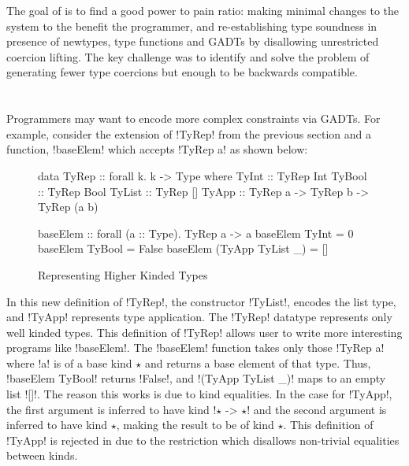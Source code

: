\documentclass[screen,nonacm,manuscript,review]{acmart} %
\begin{document}
The goal of \SFR is to find a good power to pain ratio: making
minimal changes to the system to the benefit the programmer, and
re-establishing type soundness in presence of newtypes, type functions
and GADTs by disallowing unrestricted coercion lifting. The key
challenge was to identify and solve the problem of generating fewer
type coercions but enough to be backwards compatible.

\section{\SFK}\label{sec:sfk} %
Programmers may want to encode more complex constraints via GADTs. For example,
consider the extension of !TyRep! from the previous section and a function, !baseElem!
which accepts !TyRep a! as shown below:

\begin{figure}[ht]
\begin{minipage}[ht]{0.5\linewidth}
\begin{code}
data TyRep :: forall k. k -> Type where
   TyInt  :: TyRep Int
   TyBool :: TyRep Bool
   TyList :: TyRep []
   TyApp  :: TyRep a -> TyRep b -> TyRep (a b)
\end{code}
\end{minipage}%
\begin{minipage}[ht]{0.6\linewidth}
\begin{code}
baseElem :: forall (a :: Type). TyRep a -> a
baseElem TyInt = 0
baseElem TyBool = False
baseElem (TyApp TyList _) = []
\end{code}
\end{minipage}
\caption{Representing Higher Kinded Types}
\end{figure}

In this new definition of !TyRep!, the constructor !TyList!, encodes the list type,
and !TyApp! represents type application. The !TyRep! datatype represents only well kinded
types. This definition of !TyRep! allows user
to write more interesting programs like !baseElem!.
The !baseElem! function takes only those !TyRep a! where !a! is of a base kind $\star$ and returns
a base element of that type. Thus, !baseElem TyBool! returns !False!,
and !(TyApp TyList _)! maps to an empty list ![]!.
The reason this works is due to kind equalities. In the case for !TyApp!,
the first argument is inferred to have kind !$\star$ -> $\star$! and the second argument
is inferred to have kind $\star$, making the result to be of kind $\star$. This definition of !TyApp! is
rejected in \SFP due to the restriction which disallows non-trivial equalities between kinds.
\end{document}
